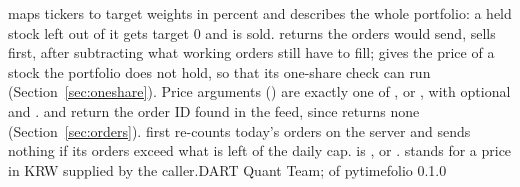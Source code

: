{{\begin{tabular}{@{}>{\RaggedRight\arraybackslash}p{106mm} >{\RaggedRight\arraybackslash}p{70mm}@{}}
\end{tabular}}}{ maps tickers to target weights in percent and describes the whole portfolio: a held stock left out of it gets target 0 and is sold.  returns the orders  would send, sells first, after subtracting what working orders still have to fill;  gives the price of a stock the portfolio does not hold, so that its one-share check can run (Section~\ref{sec:oneshare}). Price arguments () are exactly one of ,  or , with optional  and .  and  return the order ID found in the feed, since  returns none (Section~\ref{sec:orders}).  first re-counts today's orders on the server and sends nothing if its orders exceed what is left of the daily cap.  is ,  or .  stands for a price in KRW supplied by the caller.}{DART Quant Team;  of pytimefolio 0.1.0}
